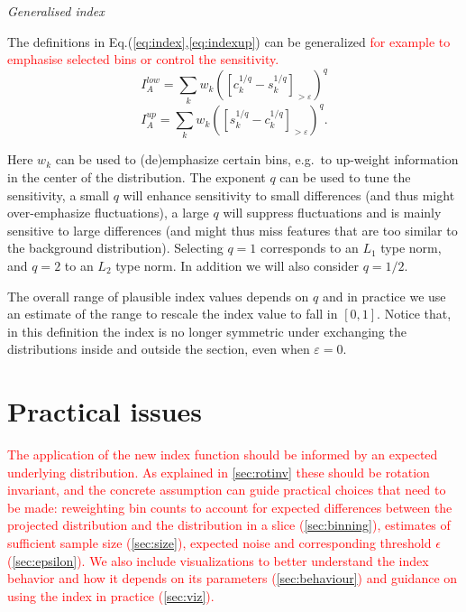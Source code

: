 \documentclass[]{interact}
\theoremstyle{plain}%
\theoremstyle{definition}
\theoremstyle{remark}
\begin{document}
\emph{Generalised index}

The definitions in Eq.(\ref{eq:index},\ref{eq:indexup}) can be
generalized
\textcolor{red}{for example to emphasise selected bins or control the sensitivity.}
\begin{equation}
I_A^{low} = \sum_{k}w_{k}\left(\left[c_{k}^{1/q}-s_{k}^{1/q}\right]_{>\varepsilon}\right)^{q}
\label{eq:index2}
\end{equation} \begin{equation}
I_A^{up} = \sum_{k}w_{k}\left(\left[s_{k}^{1/q}-c_{k}^{1/q}\right]_{>\varepsilon}\right)^{q}.
\label{eq:index2up}
\end{equation}

Here \(w_k\) can be used to (de)emphasize certain bins, e.g.~to
up-weight information in the center of the distribution. The exponent
\(q\) can be used to tune the sensitivity, a small \(q\) will enhance
sensitivity to small differences (and thus might over-emphasize
fluctuations), a large \(q\) will suppress fluctuations and is mainly
sensitive to large differences (and might thus miss features that are
too similar to the background distribution). Selecting \(q=1\)
corresponds to an \(L_1\) type norm, and \(q=2\) to an \(L_2\) type
norm. In addition we will also consider \(q=1/2\).

The overall range of plausible index values depends on \(q\) and in
practice we use an estimate of the range to rescale the index value to
fall in \([0,1]\). Notice that, in this definition the index is no
longer symmetric under exchanging the distributions inside and outside
the section, even when \(\varepsilon=0\).

\hypertarget{practical-issues}{%
\section{\texorpdfstring{Practical issues
\label{sec:practical}}{Practical issues }}\label{practical-issues}}

\textcolor{red}{
The application of the new index function should be informed by an expected underlying distribution. As explained in \ref{sec:rotinv} these should be rotation invariant, and the concrete assumption can guide practical choices that need to be made: reweighting bin counts to account for expected differences between the projected distribution and the distribution in a slice (\ref{sec:binning}), estimates of sufficient sample size (\ref{sec:size}), expected noise and corresponding threshold $\epsilon$ (\ref{sec:epsilon}).
We also include visualizations to better understand the index behavior and how it depends on its parameters (\ref{sec:behaviour}) and guidance on using the index in practice (\ref{sec:viz}).
}
\end{document}
